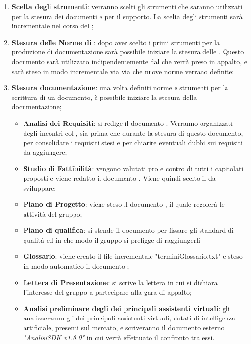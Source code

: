 \documentclass[./PianoDiProgetto.tex]{subfiles}
\begin{document}
  \begin{enumerate}
		\item \textbf{Scelta degli strumenti}: verranno scelti gli strumenti che saranno utilizzati per la stesura dei documenti e per il supporto. La scelta degli strumenti sarà incrementale nel corso del ;
		\item \textbf{Stesura delle Norme di }: dopo aver scelto i primi strumenti per la produzione di documentazione sarà possibile iniziare la stesura delle \NPdocRR. Questo documento sarà utilizzato indipendentemente dal  che verrà preso in appalto, e sarà steso in modo incrementale via via che nuove norme verrano definite;
		\item \textbf{Stesura documentazione}: una volta definiti norme e strumenti per la scrittura di un documento, è possibile iniziare la stesura della documentazione;
    \begin{itemize}
      \item \textbf{Analisi dei Requisiti}: si redige il documento \ARdocRR. Verranno organizzati degli incontri col , sia prima che durante la stesura di questo documento, per consolidare i requisiti stesi e per chiarire eventuali dubbi sui requisiti da aggiungere;
      \item \textbf{Studio di Fattibilità}: vengono valutati pro e contro di tutti i capitolati proposti e viene redatto il documento \SFdocRR. Viene quindi scelto il  da sviluppare;
      \item \textbf{Piano di Progetto}: viene steso il documento \PPdocRR, il quale regolerà le attività del gruppo;
      \item \textbf{Piano di qualifica}: si stende il documento \PQdocRR per fissare gli standard di qualità ed in che modo il gruppo si prefigge di raggiungerli;
      \item \textbf{Glossario}: viene creato il file incrementale "terminiGlossario.txt" e steso in modo automatico il documento \GldocRR;
      \item \textbf{Lettera di Presentazione}: si scrive la lettera in cui si dichiara l'interesse del gruppo a partecipare alla gara di appalto;
      \item \textbf{Analisi preliminare degli  dei principali assistenti virtuali}: gli \ANP{} analizzeranno gli  dei principali assistenti virtuali, dotati di intelligenza artificiale, presenti sul mercato, e scriveranno il documento esterno \textit{"AnalisiSDK v1.0.0"} in cui verrà effettuato il confronto tra  essi.
    \end{itemize}
  \end{enumerate}
  \newpage
\end{document}
